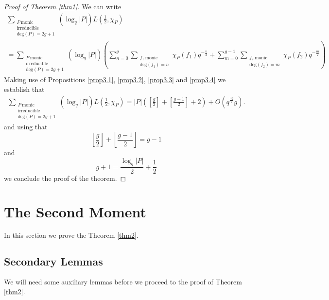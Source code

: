\documentclass[11pt]{amsart}
\begin{document}
\begin{proof}[Proof of Theorem \ref{thm1}]
We can write
\begin{multline}
\sum_{\substack{P \ \mathrm{monic} \\ \mathrm{irreducible} \\ \mathrm{deg}(P)=2g+1}}(\log_{q}|P|)L(\tfrac{1}{2},\chi_{P})\nonumber\\
=\sum_{\substack{P \ \mathrm{monic} \\ \mathrm{irreducible} \\ \mathrm{deg}(P)=2g+1}}(\log_{q}|P|)\left(\sum_{n=0}^{g}\sum_{\substack{f_{1} \ \mathrm{monic} \\ \mathrm{deg}(f_{1})=n}}\chi_{P}(f_{1})q^{-\tfrac{n}{2}}+\sum_{m=0}^{g-1}\sum_{\substack{f_{2} \ \mathrm{monic} \\ \mathrm{deg}(f_{2})=m}}\chi_{P}(f_{2})q^{-\tfrac{m}{2}}\right)
\end{multline} 
Making use of Propositions \ref{prop3.1}, \ref{prop3.2}, \ref{prop3.3} and \ref{prop3.4} we establish that
\begin{multline}
\sum_{\substack{P \ \mathrm{monic} \\ \mathrm{irreducible} \\ \mathrm{deg}(P)=2g+1}}(\log_{q}|P|)L(\tfrac{1}{2},\chi_{P})=|P|\left(\left[\frac{g}{2}\right]+\left[\frac{g-1}{2}\right]+2\right)+O(q^{\tfrac{3g}{2}}g).\nonumber
\end{multline}
and using that
\begin{equation}
\left[\frac{g}{2}\right]+\left[\frac{g-1}{2}\right]=g-1
\end{equation}
and
\begin{equation}
g+1=\frac{\log_{q}|P|}{2}+\frac{1}{2}
\end{equation}
we conclude the proof of the theorem.
\end{proof}

\section{The Second Moment}

In this section we prove the Theorem \ref{thm2}.

\subsection{Secondary Lemmas}

We will need some auxiliary lemmas before we proceed to the proof of Theorem \ref{thm2}.
\end{document}
